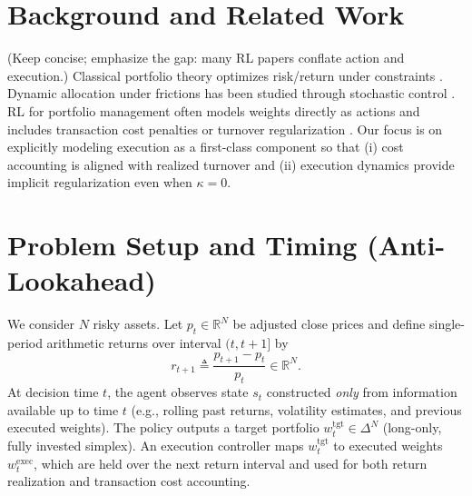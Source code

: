 \documentclass[10pt,twocolumn]{article}
\newcommand{\wexec}{w^{\mathrm{exec}}}
\newcommand{\wtgt}{w^{\mathrm{tgt}}}
\newcommand{\kappaTC}{\kappa}
\newcommand{\R}{\mathbb{R}}
\newcommand{\DeltaN}{\Delta^N}
\begin{document}
\section{Background and Related Work}
(Keep concise; emphasize the gap: many RL papers conflate action and execution.)
Classical portfolio theory optimizes risk/return under constraints \cite{markowitz1952}. Dynamic allocation under frictions has been studied through stochastic control \cite{merton1973}. RL for portfolio management often models weights directly as actions and includes transaction cost penalties or turnover regularization \cite{moody1998}. Our focus is on explicitly modeling execution as a first-class component so that (i) cost accounting is aligned with realized turnover and (ii) execution dynamics provide implicit regularization even when $\kappaTC=0$.

\section{Problem Setup and Timing (Anti-Lookahead)}
\label{sec:setup}
We consider $N$ risky assets. Let $p_t\in\R^N$ be adjusted close prices and define single-period arithmetic returns over interval $(t,t{+}1]$ by
\[
r_{t+1} \triangleq \frac{p_{t+1}-p_t}{p_t}\in\R^N.
\]
At decision time $t$, the agent observes state $s_t$ constructed \emph{only} from information available up to time $t$ (e.g., rolling past returns, volatility estimates, and previous executed weights). The policy outputs a target portfolio $\wtgt_t\in\DeltaN$ (long-only, fully invested simplex). An execution controller maps $\wtgt_t$ to executed weights $\wexec_t$, which are held over the next return interval and used for both return realization and transaction cost accounting.
\end{document}
